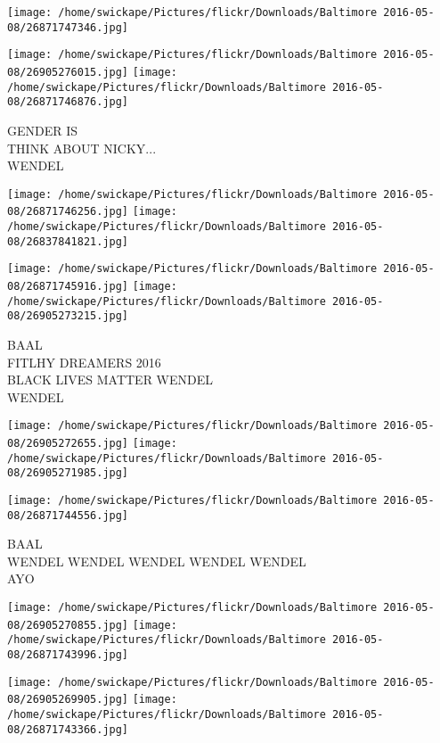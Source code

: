 \documentclass[10pt,letterpaper]{article}
\begin{document}
\texttt{[image: /home/swickape/Pictures/flickr/Downloads/Baltimore 2016-05-08/26871747346.jpg]}

\vspace{0.25in}
\texttt{[image: /home/swickape/Pictures/flickr/Downloads/Baltimore 2016-05-08/26905276015.jpg]}
\texttt{[image: /home/swickape/Pictures/flickr/Downloads/Baltimore 2016-05-08/26871746876.jpg]}

GENDER IS\\
THINK ABOUT NICKY...\\
WENDEL\\
\pagebreak

\texttt{[image: /home/swickape/Pictures/flickr/Downloads/Baltimore 2016-05-08/26871746256.jpg]}
\texttt{[image: /home/swickape/Pictures/flickr/Downloads/Baltimore 2016-05-08/26837841821.jpg]}

\texttt{[image: /home/swickape/Pictures/flickr/Downloads/Baltimore 2016-05-08/26871745916.jpg]}
\texttt{[image: /home/swickape/Pictures/flickr/Downloads/Baltimore 2016-05-08/26905273215.jpg]}

BAAL\\
FITLHY DREAMERS 2016\\
BLACK LIVES MATTER WENDEL\\
WENDEL\\
\pagebreak

\texttt{[image: /home/swickape/Pictures/flickr/Downloads/Baltimore 2016-05-08/26905272655.jpg]}
\texttt{[image: /home/swickape/Pictures/flickr/Downloads/Baltimore 2016-05-08/26905271985.jpg]}

\vspace{0.25in}
\texttt{[image: /home/swickape/Pictures/flickr/Downloads/Baltimore 2016-05-08/26871744556.jpg]}

BAAL\\
WENDEL WENDEL WENDEL WENDEL WENDEL\\
AYO\\
\pagebreak

\texttt{[image: /home/swickape/Pictures/flickr/Downloads/Baltimore 2016-05-08/26905270855.jpg]}
\texttt{[image: /home/swickape/Pictures/flickr/Downloads/Baltimore 2016-05-08/26871743996.jpg]}

\texttt{[image: /home/swickape/Pictures/flickr/Downloads/Baltimore 2016-05-08/26905269905.jpg]}
\texttt{[image: /home/swickape/Pictures/flickr/Downloads/Baltimore 2016-05-08/26871743366.jpg]}
\end{document}
